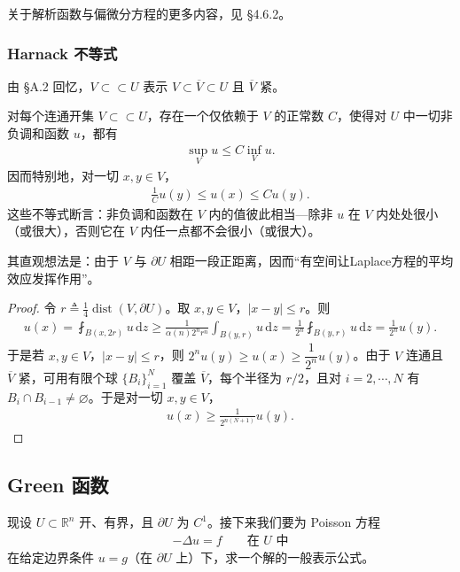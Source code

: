 \documentclass[../../main.tex]{subfiles}
\begin{document}
关于解析函数与偏微分方程的更多内容，见 \S4.6.2。

\subsubsection{Harnack 不等式}

由 \S A.2 回忆，$V\subset\!\subset U$ 表示 $V\subset\overline{V}\subset U$ 且 $\overline{V}$ 紧。

\begin{theorem}\label{theorem:ch02-harnack}对每个连通开集 $V\subset\!\subset U$，存在一个仅依赖于 $V$ 的正常数 $C$，使得对 $U$ 中一切非负调和函数 $u$，都有
\begin{align*}
\sup_V u\leqslant C\inf_V u.
\end{align*}
因而特别地，对一切 $x,y\in V$，
\begin{align*}
\frac{1}{C}u(y)\leqslant u(x)\leqslant C u(y).
\end{align*}
这些不等式断言：非负调和函数在 $V$ 内的值彼此相当---除非 $u$ 在 $V$ 内处处很小（或很大），否则它在 $V$ 内任一点都不会很小（或很大）。

其直观想法是：由于 $V$ 与 $\partial U$ 相距一段正距离，因而``有空间让Laplace方程的平均效应发挥作用''。
\end{theorem}

\begin{proof}
令 $r\triangleq\frac{1}{4}\operatorname{dist}(V,\partial U)$。取 $x,y\in V$，$|x-y|\leqslant r$。则
\begin{align*}
u(x)=\fint_{B(x,2r)}u\,\mathrm{d}z\geqslant\frac{1}{\alpha(n)2^n r^n}\int_{B(y,r)}u\,\mathrm{d}z
=\frac{1}{2^n}\fint_{B(y,r)}u\,\mathrm{d}z=\frac{1}{2^n}u(y).
\end{align*}
于是若 $x,y\in V$，$|x-y|\leqslant r$，则 $2^n u(y)\geqslant u(x)\geqslant\dfrac{1}{2^n}u(y)$。由于 $V$ 连通且 $\overline{V}$ 紧，可用有限个球 $\{B_i\}_{i=1}^N$ 覆盖 $\overline{V}$，每个半径为 $r/2$，且对 $i=2,\cdots,N$ 有 $B_i\cap B_{i-1}\neq\varnothing$。于是对一切 $x,y\in V$，
\begin{align*}
u(x)\geqslant\frac{1}{2^{n(N+1)}}u(y).
\end{align*}
\end{proof}

\subsection{Green 函数}\label{subsection:ch02-green}

现设 $U\subset\mathbb{R}^n$ 开、有界，且 $\partial U$ 为 $C^1$。接下来我们要为 Poisson 方程
\begin{align*}
-\Delta u=f \qquad \text{在 }U\text{ 中}
\end{align*}
在给定边界条件 $u=g$（在 $\partial U$ 上）下，求一个解的一般表示公式。
\end{document}
